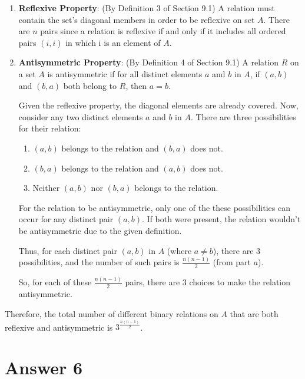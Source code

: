 \documentclass[12pt]{article}
\begin{document}
\begin{enumerate}
    \item \textbf{Reflexive Property}:
    (By Definition 3 of Section 9.1) A relation must contain the set's diagonal members in order to be reflexive on set \( A \). There are \( n \) pairs since a relation is reflexive if and only if it includes all ordered pairs \( (i, i) \) in which i is an element of \( A \).\\
    
    \item \textbf{Antisymmetric Property}:
    (By Definition 4 of Section 9.1) A relation \( R \) on a set \( A \) is antisymmetric if for all distinct elements \( a \) and \( b \) in \( A \), if \( (a, b) \) and \( (b, a) \) both belong to \( R \), then \( a = b \).
    
    Given the reflexive property, the diagonal elements are already covered. Now, consider any two distinct elements \( a \) and \( b \) in \( A \). There are three possibilities for their relation:
    
    \begin{enumerate}
        \item \( (a, b) \) belongs to the relation and \( (b, a) \) does not.
        \item \( (b, a) \) belongs to the relation and \( (a, b) \) does not.
        \item Neither \( (a, b) \) nor \( (b, a) \) belongs to the relation.
    \end{enumerate}
    
    For the relation to be antisymmetric, only one of the these possibilities can occur for any distinct pair \( (a, b) \). If both were present, the relation wouldn't be antisymmetric due to the given definition.
    
    Thus, for each distinct pair \( (a, b) \) in \( A \) (where \( a \neq b \)), there are 3 possibilities, and the number of such pairs is \( \frac{n(n-1)}{2} \) (from part \(a\)). 
    
    So, for each of these \( \frac{n(n-1)}{2} \) pairs, there are 3 choices to make the relation antisymmetric.
\end{enumerate}

Therefore, the total number of different binary relations on \( A \) that are both reflexive and antisymmetric is \( 3^{\frac{n(n-1)}{2}} \).



\section*{Answer 6}
\end{document}
